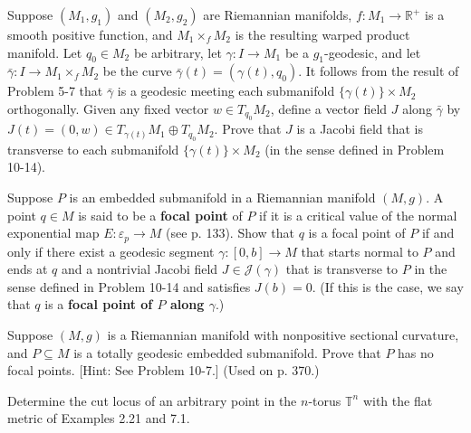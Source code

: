 \begin{exercise}
\label{prob:jacobi-warped-product}

Suppose $(M_1,g_1)$ and $(M_2,g_2)$ are Riemannian manifolds, $f: M_1 \to \mathbb{R}^+$ is a smooth positive function, and $M_1 \times_f M_2$ is the resulting warped product manifold. Let $q_0 \in M_2$ be arbitrary, let $\gamma: I \to M_1$ be a $g_1$-geodesic, and let $\bar{\gamma}: I \to M_1 \times_f M_2$ be the curve $\bar{\gamma}(t) = (\gamma(t),q_0)$. It follows from the result of Problem 5-7 that $\bar{\gamma}$ is a geodesic meeting each submanifold $\{\gamma(t)\} \times M_2$ orthogonally. Given any fixed vector $w \in T_{q_0}M_2$, define a vector field $J$ along $\bar{\gamma}$ by $J(t) = (0,w) \in T_{\gamma(t)}M_1 \oplus T_{q_0}M_2$. Prove that $J$ is a Jacobi field that is transverse to each submanifold $\{\gamma(t)\} \times M_2$ (in the sense defined in Problem 10-14).
\end{exercise}

\begin{exercise}\label{prob:focal-point-characterization}
Suppose $P$ is an embedded submanifold in a Riemannian manifold $(M,g)$. A point $q \in M$ is said to be a \textbf{focal point} of $P$ if it is a critical value of the normal exponential map $E: \varepsilon_p \to M$ (see p. 133). Show that $q$ is a focal point of $P$ if and only if there exist a geodesic segment $\gamma: [0,b] \to M$ that starts normal to $P$ and ends at $q$ and a nontrivial Jacobi field $J \in \mathcal{J}(\gamma)$ that is transverse to $P$ in the sense defined in Problem 10-14 and satisfies $J(b) = 0$. (If this is the case, we say that $q$ is a \textbf{focal point of $P$ along $\gamma$}.)
\end{exercise}

\begin{exercise}\label{prob:nonpositive-curvature-focal-points}
Suppose $(M,g)$ is a Riemannian manifold with nonpositive sectional curvature, and $P \subseteq M$ is a totally geodesic embedded submanifold. Prove that $P$ has no focal points. [Hint: See Problem 10-7.] (Used on p. 370.)
\end{exercise}

\begin{exercise}\label{prob:cut-locus-flat-torus}
Determine the cut locus of an arbitrary point in the $n$-torus $\mathbb{T}^n$ with the flat metric of Examples 2.21 and 7.1.
\end{exercise}

